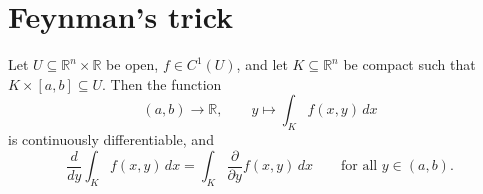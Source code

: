 
\section{Feynman's trick}
\label{sec:feynmans_trick}

\begin{theorem}
\label{thm:feynmans_trick}
Let $U \subseteq \mathbb{R}^n\times\mathbb{R}$ be open, $f \in C^1(U)$, and let
$K \subseteq \mathbb{R}^n$ be compact such that $K\times[a,b] \subseteq U$. Then the function
\[(a,b) \to \mathbb{R}, \qquad y \mapsto \int_K f(x,y)\,dx\]
is continuously differentiable, and
\[\frac{d}{dy}\int_K f(x,y)\,dx = \int_K \frac{\partial}{\partial y}f(x,y)\,dx
\qquad \text{for all } y \in (a,b).\]
\end{theorem}

